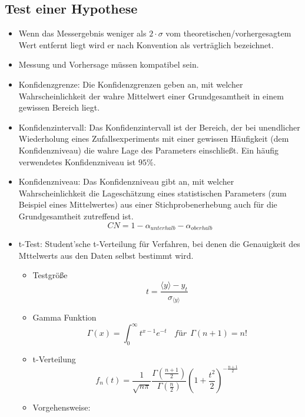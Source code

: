 \documentclass[10pt,a4paper]{article}
\begin{document}
\subsection{Test einer Hypothese}
\begin{itemize}
\item Wenn das Messergebnis weniger als $2\cdot \sigma$ vom theoretischen/vorhergesagtem Wert entfernt liegt wird er nach Konvention als verträglich bezeichnet.
\item Messung und Vorhersage müssen kompatibel sein.
\item Konfidenzgrenze: Die Konfidenzgrenzen geben an, mit welcher Wahrscheinlichkeit der wahre Mittelwert einer Grundgesamtheit in einem gewissen Bereich liegt. 
\item Konfidenzintervall: Das Konfidenzintervall ist der Bereich, der bei unendlicher Wiederholung eines Zufallsexperiments mit einer gewissen Häufigkeit (dem Konfidenzniveau) die wahre Lage des Parameters einschließt. Ein häufig verwendetes Konfidenzniveau ist $95\%$.
\item Konfidenzniveau: Das Konfidenzniveau gibt an, mit welcher Wahrscheinlichkeit die Lageschätzung eines statistischen Parameters (zum Beispiel eines Mittelwertes) aus einer Stichprobenerhebung auch für die Grundgesamtheit zutreffend ist.
\begin{equation}
CN=1-\alpha_{unterhalb}-\alpha_{oberhalb}
\end{equation}
\newpage
\item t-Test:\newline
Student'sche t-Verteilung für Verfahren, bei denen die Genauigkeit des Mttelwerts aus den Daten selbst bestimmt wird.
\begin{itemize}
\item Testgröße 
\begin{equation}
t=\frac{\langle y \rangle -y_t}{\sigma_{\langle y \rangle}}
\end{equation}
\item Gamma Funktion
\begin{equation}
\Gamma(x)=\int^{\infty}_{0}{t^{x-1}e^{-t}}~~~~\textit{für}~~\Gamma(n+1)=n!
\end{equation}
\item t-Verteilung
\begin{equation}
f_n(t)=\frac{1}{\sqrt{n\pi}}\frac{\Gamma(\frac{n+1}{2})}{\Gamma(\frac{n}{2})}(1+\frac{t^2}{2})^{-\frac{n+1}{2}}
\end{equation}
\item Vorgehensweise: \newline

\end{itemize}
\end{itemize}
\end{document}
